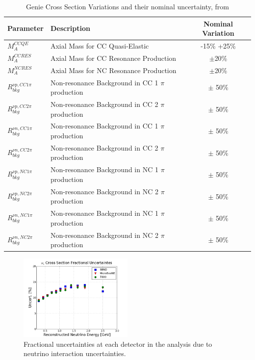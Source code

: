 {
\renewcommand{\arraystretch}{1.5}
\begin{table}[tb]
  \caption[Genie Cross Section Variations]{Genie Cross Section Variations and their nominal uncertainty, from \cite{Genie_manual}}
  \label{tab:genie_xsec_params}
  \centering

  \begin{tabular}{l|lc}
  \hline

  \hline
  \textbf{Parameter} & \textbf{Description} & \textbf{Nominal Variation} \\
  \hline
     $M_A^{CCQE}$ & Axial Mass for CC Quasi-Elastic & -15\% +25\%  \\
     $M_A^{CCRES}$ & Axial Mass for CC Resonance Production & $\pm$20\%  \\
     $M_A^{NCRES}$ & Axial Mass for NC Resonance Production & $\pm$20\%  \\
     $R_{bkg}^{\nu p, CC 1 \pi}$& Non-resonance Background in CC 1 $\pi$ production & $\pm$ 50\% \\
     $R_{bkg}^{\nu p, CC 2 \pi}$& Non-resonance Background in CC 2 $\pi$ production & $\pm$ 50\% \\
     $R_{bkg}^{\nu n, CC 1 \pi}$& Non-resonance Background in CC 1 $\pi$ production & $\pm$ 50\% \\
     $R_{bkg}^{\nu n, CC 2 \pi}$& Non-resonance Background in CC 2 $\pi$ production & $\pm$ 50\% \\
     $R_{bkg}^{\nu p, NC 1 \pi}$& Non-resonance Background in NC 1 $\pi$ production & $\pm$ 50\% \\
     $R_{bkg}^{\nu p, NC 2 \pi}$& Non-resonance Background in NC 2 $\pi$ production & $\pm$ 50\% \\
     $R_{bkg}^{\nu n, NC 1 \pi}$& Non-resonance Background in NC 1 $\pi$ production & $\pm$ 50\% \\
     $R_{bkg}^{\nu n, NC 2 \pi}$& Non-resonance Background in NC 2 $\pi$ production & $\pm$ 50\% \\
  \hline

  \hline
  \end{tabular}
\end{table}
}


\begin{figure}[h]
    \centering
    \includegraphics[width=0.5\textwidth]{systematics_figures/matrixFile_nue_ND_100m_uB_T600_onaxis_xsec_0_ecalo2_nu_vePhot0.05_gap3_fracUncert}
    \caption[\nue Cross Section Uncertainties]{Fractional uncertainties at each detector in the \nue analysis due to neutrino interaction uncertainties.}
   \label{fig:sys_xsec_uncert_fracUncert}
\end{figure}

